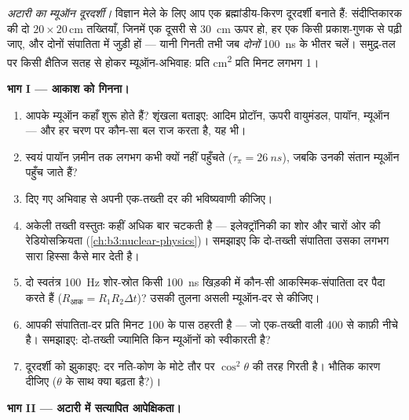 \begin{problem}\label{pb:b3:particle-physics:1}
\emph{अटारी का म्यूऑन दूरदर्शी।} विज्ञान मेले के लिए आप एक
ब्रह्मांडीय-किरण दूरदर्शी बनाते हैं: संदीप्तिकारक की दो
$20\times20$\,\unit{cm} तख्तियाँ, जिनमें एक दूसरी से \qty{30}{cm} ऊपर
हो, हर एक किसी प्रकाश-गुणक से पढ़ी जाए, और दोनों संपातिता में जुड़ी
हों --- यानी गिनती तभी जब \emph{दोनों} \qty{100}{ns} के भीतर चलें।
समुद्र-तल पर किसी क्षैतिज सतह से होकर म्यूऑन-अभिवाह:
प्रति \unit{cm^2} प्रति मिनट लगभग 1।

\medskip\noindent\textbf{भाग I --- आकाश को गिनना।}

\begin{enumerate}
  \item आपके म्यूऑन कहाँ शुरू होते हैं? शृंखला बताइए: आदिम
        प्रोटॉन, ऊपरी वायुमंडल, पायॉन, म्यूऑन --- और हर चरण पर कौन-सा
        बल राज करता है, यह भी।
  \item स्वयं पायॉन ज़मीन तक लगभग कभी क्यों नहीं पहुँचते
        ($\tau_\pi = \qty{26}{ns}$), जबकि उनकी संतान
        म्यूऑन पहुँच जाते हैं?
  \item दिए गए अभिवाह से अपनी एक-तख्ती दर की भविष्यवाणी कीजिए।
  \item अकेली तख्ती वस्तुतः कहीं अधिक बार चटकती है ---
        इलेक्ट्रॉनिकी का शोर और चारों ओर की रेडियोसक्रियता
        (\cref{ch:b3:nuclear-physics})। समझाइए कि
        दो-तख्ती संपातिता उसका लगभग सारा हिस्सा कैसे मार देती है।
  \item दो स्वतंत्र \qty{100}{Hz} शोर-स्रोत किसी \qty{100}{ns}
        खिड़की में कौन-सी आकस्मिक-संपातिता दर पैदा करते हैं
        ($R_{\text{आक}} = R_1R_2\Delta t$)? उसकी तुलना
        असली म्यूऑन-दर से कीजिए।
  \item आपकी संपातिता-दर प्रति मिनट 100 के पास ठहरती है ---
        जो एक-तख्ती वाली 400 से काफ़ी नीचे है। समझाइए: दो-तख्ती
        ज्यामिति किन म्यूऑनों को स्वीकारती है?
  \item दूरदर्शी को झुकाइए: दर नति-कोण के मोटे तौर पर
        $\cos^2\theta$ की तरह गिरती है। भौतिक कारण दीजिए
        ($\theta$ के साथ क्या बढ़ता है?)।
\end{enumerate}

\medskip\noindent\textbf{भाग II --- अटारी में सत्यापित आपेक्षिकता।}


\end{problem}
